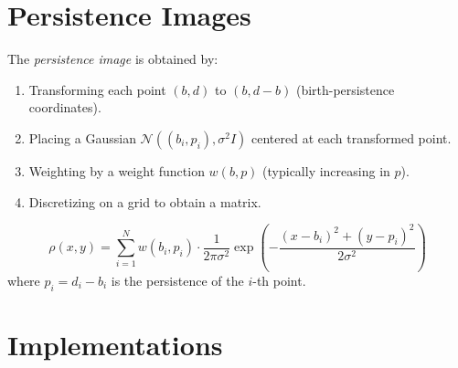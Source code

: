 \section{Persistence Images}

\begin{definition}
The \emph{persistence image} is obtained by:
\begin{enumerate}
  \item Transforming each point $(b, d)$ to $(b, d-b)$
        (birth-persistence coordinates).
  \item Placing a Gaussian $\mathcal{N}((b_i, p_i), \sigma^2 I)$
        centered at each transformed point.
  \item Weighting by a weight function $w(b, p)$ (typically increasing
        in $p$).
  \item Discretizing on a grid to obtain a matrix.
\end{enumerate}
\end{definition}

\begin{keyformulas}[title=\textbf{Persistence Image}]
\[
  \rho(x, y) = \sum_{i=1}^{N} w(b_i, p_i) \cdot
  \frac{1}{2\pi\sigma^2}
  \exp\left(-\frac{(x - b_i)^2 + (y - p_i)^2}{2\sigma^2}\right)
\]
where $p_i = d_i - b_i$ is the persistence of the $i$-th point.
\end{keyformulas}

\section{Implementations}

